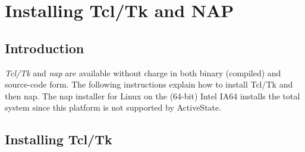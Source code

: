     \section{Installing Tcl/Tk and NAP}

  \subsection{
    \label{Introduction}Introduction
  }

  \emph{Tcl/Tk} and 
  \emph{nap} are available without charge in both binary (compiled)
  and source-code form. The following instructions explain how to
  install Tcl/Tk and then nap. The nap installer for Linux on the
  (64-bit) Intel IA64 installs the total system since this platform is
  not supported by ActiveState.
  \subsection{
    \label{Installing:Tcl:Tk}Installing Tcl/Tk
  }


